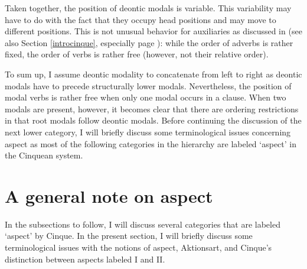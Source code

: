 \begin{exe}
\ex\label{deonticexamplesdgscombiningbla}\begin{xlist}
\end{xlist}
\end{exe}

\noindent Taken together, the position of deontic modals is variable. This variability may have to do with the fact that they occupy head positions and may move to different positions. This is not unusual behavior for auxiliaries as discussed in \citet[49]{cinque1999adverbs}  (see also Section \ref{introcinque}, especially page \pageref{finiteauxcinque}): while the order of adverbs is rather fixed, the order of verbs is rather free (however, not their relative order).

To sum up, I assume deontic modality to concatenate from left to right as deontic modals have to precede structurally lower modals. Nevertheless, the position of modal verbs is rather free when only one modal occurs in a clause. When two modals are present, however, it becomes clear that there are ordering restrictions in that root modals follow deontic modals. Before continuing the discussion of the next lower category, I will briefly discuss some terminological issues concerning aspect as most of the following categories in the hierarchy are labeled `aspect' in the Cinquean system.

\section{A general note on aspect}\label{generalaspect}
In the subsections to follow, I will discuss several categories that are labeled `aspect' by Cinque. In the present section, I will briefly discuss some terminological issues with the notions of aspect, Aktionsart, and Cinque's distinction between aspects labeled I and II. 

